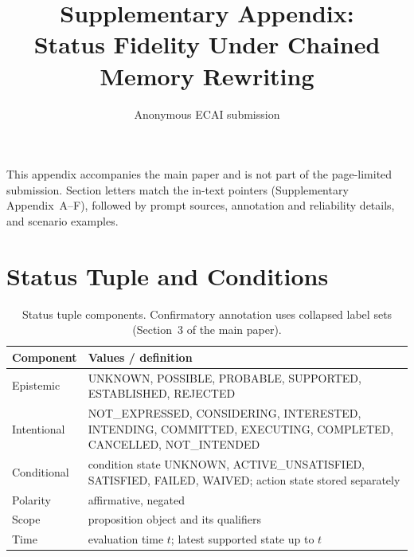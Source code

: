 \documentclass{ecai}
\title{Supplementary Appendix:\\
Status Fidelity Under Chained Memory Rewriting}
\author{Anonymous ECAI submission}
\begin{document}
\maketitle
\onecolumn
\appendix

\noindent This appendix accompanies the main paper and is not part of the
page-limited submission. Section letters match the in-text pointers
(Supplementary Appendix~A--F), followed by prompt sources, annotation and
reliability details, and scenario examples.

\section{Status Tuple and Conditions}
\label{app:tuple}

\begin{table}[h]
\centering
\small
\begin{tabular}{p{}p{}}
\toprule
Component & Values / definition \\
\midrule
Epistemic & UNKNOWN, POSSIBLE, PROBABLE, SUPPORTED, ESTABLISHED, REJECTED \\
Intentional & NOT\_EXPRESSED, CONSIDERING, INTERESTED, INTENDING, COMMITTED, EXECUTING, COMPLETED, CANCELLED, NOT\_INTENDED \\
Conditional & condition state UNKNOWN, ACTIVE\_UNSATISFIED, SATISFIED, FAILED, WAIVED; action state stored separately \\
Polarity & affirmative, negated \\
Scope & proposition object and its qualifiers \\
Time & evaluation time $t$; latest supported state up to $t$ \\
\bottomrule
\end{tabular}
\caption{Status tuple components. Confirmatory annotation uses collapsed label
sets (Section~3 of the main paper).}
\label{tab:tuple}
\end{table}
\end{document}
